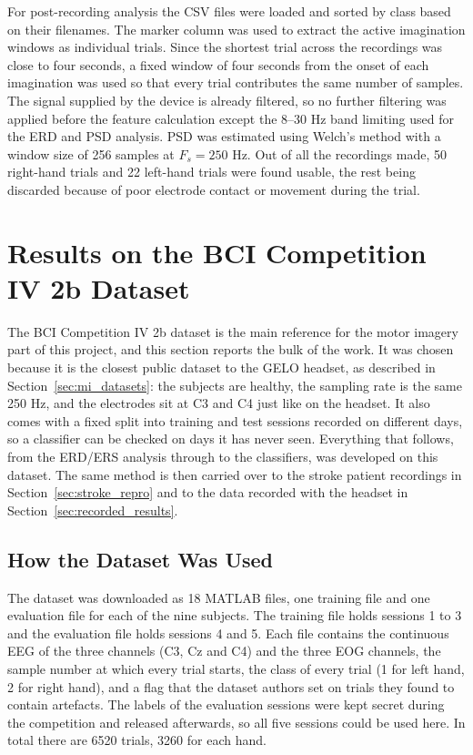 For post-recording analysis the CSV files were loaded and sorted by class based on their
filenames. The marker column was used to extract the active imagination windows as
individual trials. Since the shortest trial across the recordings was close to four
seconds, a fixed window of four seconds from the onset of each imagination was used so that
every trial contributes the same number of samples. The signal supplied by the device is
already filtered, so no further filtering was applied before the feature calculation except
the 8--30 Hz band limiting used for the ERD and PSD analysis. PSD was estimated using
Welch's method \cite{welch1967} with a window size of 256 samples at $F_s = 250$ Hz. Out of all the
recordings made, 50 right-hand trials and 22 left-hand trials were found usable, the rest
being discarded because of poor electrode contact or movement during the trial.

\FloatBarrier

\section{Results on the BCI Competition IV 2b Dataset}
\label{sec:bci2b}

The BCI Competition IV 2b dataset is the main reference for the motor imagery part of this
project, and this section reports the bulk of the work. It was chosen because it is the
closest public dataset to the GELO headset, as described in
Section~\ref{sec:mi_datasets}: the subjects are healthy, the sampling rate is the same
250 Hz, and the electrodes sit at C3 and C4 just like on the headset. It also comes with a
fixed split into training and test sessions recorded on different days, so a classifier
can be checked on days it has never seen. Everything that follows, from the ERD/ERS
analysis through to the classifiers, was developed on this dataset. The same method is
then carried over to the stroke patient recordings in
Section~\ref{sec:stroke_repro} and to the data recorded with the headset in
Section~\ref{sec:recorded_results}.

\subsection{How the Dataset Was Used}

The dataset was downloaded as 18 MATLAB files, one training file and one evaluation file
for each of the nine subjects. The training file holds sessions 1 to 3 and the evaluation
file holds sessions 4 and 5. Each file contains the continuous EEG of the three channels
(C3, Cz and C4) and the three EOG channels, the sample number at which every trial starts,
the class of every trial (1 for left hand, 2 for right hand), and a flag that the dataset
authors set on trials they found to contain artefacts. The labels of the evaluation
sessions were kept secret during the competition and released afterwards, so all five
sessions could be used here. In total there are 6520 trials, 3260 for each hand.

